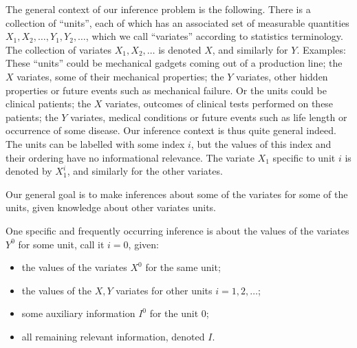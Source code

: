 \documentclass[\ifafour a4paper,12pt,\else a5paper,10pt,\fi%
onecolumn,oneside,article,%
british%
]{memoir}
\theoremstyle{remark}
\theoremstyle{innote}
\renewcommand*{\|}[1][]{\nonscript\:#1\vert\nonscript\:\mathopen{}}
\begin{document}
The general context of our inference problem is the following. There is a collection of \enquote{units}, each of which has an associated set of measurable quantities $X_{1},X_{2},\dotsc,Y_{1},Y_{2},\dotsc$, which we call \enquote{variates} according to statistics terminology. The collection of variates $X_{1},X_{2},\dotsc$ is denoted $X$, and similarly for $Y$. %
Examples: These \enquote{units} could be mechanical gadgets coming out of a production line; the $X$ variates, some of their mechanical properties; the $Y$ variates, other hidden properties or future events such as mechanical failure. Or the units could be clinical patients; the $X$ variates, outcomes of clinical tests performed on these patients; the $Y$ variates, medical conditions or future events such as life length or occurrence of some disease. Our inference context is thus quite general indeed. The units can be labelled with some index $i$, but the values of this index and their ordering have no informational relevance. The variate $X_{1}$ specific to unit $i$ is denoted by $X^{i}_{1}$, and similarly for the other variates.

Our general goal is to make inferences about some of the variates for some of the units, given knowledge about other variates units.

One specific and frequently occurring inference is about the values of the variates $Y^{0}$ for some unit, call it $i=0$, given:
\begin{itemize}%
\item the values of the variates $X^{0}$ for the same unit; \item the values of the $X,Y$ variates for other units $i=1,2,\dotsc$; \item some auxiliary information $I^{0}$ for the unit $0$; \item all remaining relevant information, denoted $I$.
\end{itemize}
\end{document}

